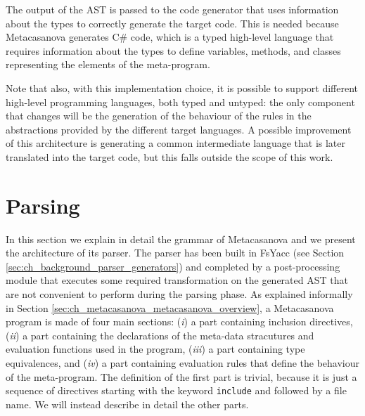 The output of the AST is passed to the code generator that uses information about the types to correctly generate the target code. This is needed because Metacasanova generates C\# code, which is a typed high-level language that requires information about the types to define variables, methods, and classes representing the elements of the meta-program.

Note that also, with this implementation choice, it is possible to support different high-level programming languages, both typed and untyped: the only component that changes will be the generation of the behaviour of the rules in the abstractions provided by the different target languages. A possible improvement of this architecture is generating a common intermediate language that is later translated into the target code, but this falls outside the scope of this work.


\section{Parsing}
\label{sec:ch_metacasanova_parsing}
In this section we explain in detail the grammar of Metacasanova and we present the architecture of its parser. The parser has been built in FsYacc (see Section \ref{sec:ch_background_parser_generators}) and completed by a post-processing module that executes some required transformation on the generated AST that are not convenient to perform during the parsing phase. As explained informally in Section \ref{sec:ch_metacasanova_metacasanova_overview}, a Metacasanova program is made of four main sections: (\textit{i}) a part containing inclusion directives, (\textit{ii}) a part containing the declarations of the meta-data stracutures and evaluation functions used in the program, (\textit{iii}) a part containing type equivalences, and (\textit{iv}) a part containing evaluation rules that define the behaviour of the meta-program. The definition of the first part is trivial, because it is just a sequence of directives starting with the keyword \texttt{include} and followed by a file name. We will instead describe in detail the other parts.
	
